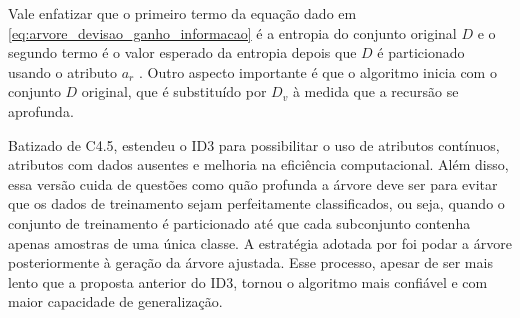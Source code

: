 Vale enfatizar que o primeiro termo da equação dado em \ref{eq:arvore_devisao_ganho_informacao} é a entropia do conjunto original $D$ e o segundo termo é o valor esperado da entropia depois que $D$ é particionado usando o atributo $a_r$ \citep{mitchell:97}. Outro aspecto importante é que o algoritmo inicia com o conjunto $D$ original, que é substituído por $D_v$ à medida que a recursão se aprofunda.

Batizado de C4.5, \citet{quinlan:93} estendeu o ID3 para possibilitar o uso de atributos contínuos, atributos com dados ausentes e melhoria na eficiência computacional. Além disso, essa versão cuida de questões como quão profunda a árvore deve ser para evitar que os dados de treinamento sejam perfeitamente classificados, ou seja, quando o conjunto de treinamento é particionado até que cada subconjunto contenha apenas amostras de uma única classe. A estratégia adotada por \citet{quinlan:93} foi podar a árvore posteriormente à geração da árvore ajustada. Esse processo, apesar de ser mais lento que a proposta anterior do ID3, tornou o algoritmo mais confiável e com maior capacidade de generalização.


\begin{comment}
\section{Exemplo de Código-Fonte em Java}
\label{sec:exemplo_codigo_fonte}

\begin{lstlisting}[frame=trbl]
   for(i = 0; i < 20; i++)
   {
       // Comentário 
       System.out.println("Mensagem...");
   }
\end{lstlisting}
\end{comment}
